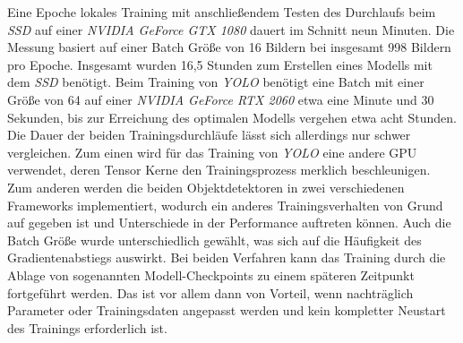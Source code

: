 Eine Epoche lokales Training mit anschließendem Testen des Durchlaufs beim \textit{SSD} auf einer \textit{NVIDIA GeForce GTX 1080} dauert im Schnitt neun Minuten. Die Messung basiert auf einer Batch Größe von 16 Bildern bei insgesamt 998 Bildern pro Epoche. Insgesamt wurden 16,5 Stunden zum Erstellen eines Modells mit dem \textit{SSD} benötigt. Beim Training von \textit{YOLO} benötigt eine Batch mit einer Größe von 64 auf einer \textit{NVIDIA GeForce RTX 2060} etwa eine Minute und 30 Sekunden, bis zur Erreichung des optimalen Modells vergehen etwa acht Stunden. Die Dauer der beiden Trainingsdurchläufe lässt sich allerdings nur schwer vergleichen. Zum einen wird für das Training von \textit{YOLO} eine andere GPU verwendet, deren Tensor Kerne den Trainingsprozess merklich beschleunigen. Zum anderen werden die beiden Objektdetektoren in zwei verschiedenen Frameworks implementiert, wodurch ein anderes Trainingsverhalten von Grund auf gegeben ist und Unterschiede in der Performance auftreten können. Auch die Batch Größe wurde unterschiedlich gewählt, was sich auf die Häufigkeit des Gradientenabstiegs auswirkt. Bei beiden Verfahren kann das Training durch die Ablage von sogenannten Modell-Checkpoints zu einem späteren Zeitpunkt fortgeführt werden. Das ist vor allem dann von Vorteil, wenn nachträglich Parameter oder Trainingsdaten angepasst werden und kein kompletter Neustart des Trainings erforderlich ist.
